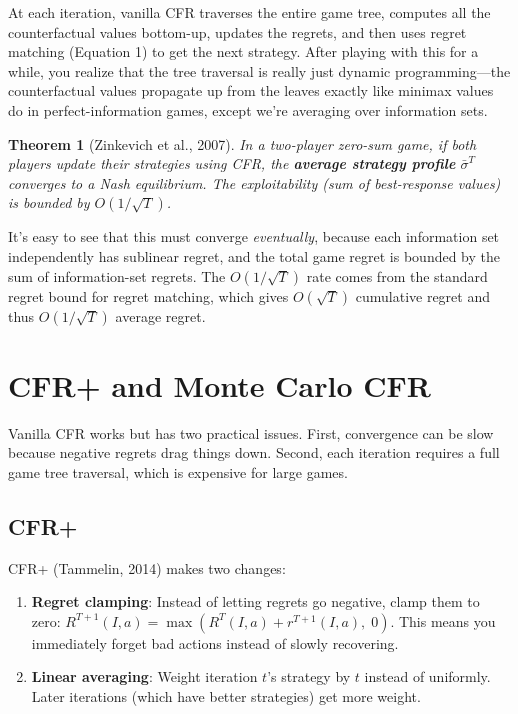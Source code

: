 \documentclass[11pt]{article}
\newtheorem{theorem}{Theorem}
\begin{document}
At each iteration, vanilla CFR traverses the entire game tree, computes all the counterfactual values bottom-up, updates the regrets, and then uses regret matching (Equation 1) to get the next strategy. After playing with this for a while, you realize that the tree traversal is really just dynamic programming---the counterfactual values propagate up from the leaves exactly like minimax values do in perfect-information games, except we're averaging over information sets.

\begin{theorem}[Zinkevich et al., 2007]
In a two-player zero-sum game, if both players update their strategies using CFR, the \textbf{average strategy profile} $\bar{\sigma}^T$ converges to a Nash equilibrium. The exploitability (sum of best-response values) is bounded by $O(1/\sqrt{T})$.
\end{theorem}

It's easy to see that this must converge \textit{eventually}, because each information set independently has sublinear regret, and the total game regret is bounded by the sum of information-set regrets. The $O(1/\sqrt{T})$ rate comes from the standard regret bound for regret matching, which gives $O(\sqrt{T})$ cumulative regret and thus $O(1/\sqrt{T})$ average regret.

\section{CFR+ and Monte Carlo CFR}

Vanilla CFR works but has two practical issues. First, convergence can be slow because negative regrets drag things down. Second, each iteration requires a full game tree traversal, which is expensive for large games.

\subsection{CFR+}

CFR+ (Tammelin, 2014) makes two changes:
\begin{enumerate}
    \item \textbf{Regret clamping}: Instead of letting regrets go negative, clamp them to zero: $R^{T+1}(I,a) = \max(R^T(I,a) + r^{T+1}(I,a),\; 0)$. This means you immediately forget bad actions instead of slowly recovering.
    \item \textbf{Linear averaging}: Weight iteration $t$'s strategy by $t$ instead of uniformly. Later iterations (which have better strategies) get more weight.
\end{enumerate}
\end{document}
